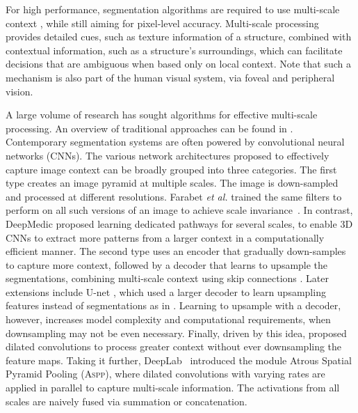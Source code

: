 \documentclass{llncs}
\begin{document}
For high performance, segmentation algorithms are required to use multi-scale context \cite{galleguillos2010context}, while still aiming for pixel-level accuracy. Multi-scale processing provides detailed cues, such as texture information of a structure, combined with contextual information, such as a structure's surroundings, which can facilitate decisions that are ambiguous when based only on local context. Note that such a mechanism is also part of the human visual system, via foveal and peripheral vision.

A large volume of research has sought algorithms for effective multi-scale processing. An overview of traditional approaches can be found in \cite{galleguillos2010context}. Contemporary segmentation systems are often powered by convolutional neural networks (CNNs). The various network architectures proposed to effectively capture image context can be broadly grouped into three categories. The first type creates an image pyramid at multiple scales. The image is down-sampled and processed at different resolutions. Farabet \textit{et al.} trained the same filters to perform on all such versions of an image to achieve scale invariance~\cite{farabet2013learning}. In contrast, DeepMedic \cite{Kamnitsas2017EfficientM3} proposed learning dedicated pathways for several scales, to enable 3D CNNs to extract more patterns from a larger context in a computationally efficient manner. The second type uses an encoder that gradually down-samples to capture more context, followed by a decoder that learns to upsample the segmentations, combining multi-scale context using skip connections \cite{long2015fully}. Later extensions include U-net \cite{ronneberger2015u}, which used a larger decoder to learn upsampling features instead of segmentations as in \cite{long2015fully}. Learning to upsample with a decoder, however, increases model complexity and computational requirements, when downsampling may not be even necessary. Finally, driven by this idea, \cite{chen2016deeplab,yu2015multi} proposed dilated convolutions to process greater context without ever downsampling the feature maps. Taking it further, DeepLab~\cite{chen2016deeplab} introduced the module Atrous Spatial Pyramid Pooling (\textsc{Aspp}), where dilated convolutions with varying rates are applied in parallel to capture multi-scale information. The activations from all scales are naively fused via summation or concatenation.
\end{document}
